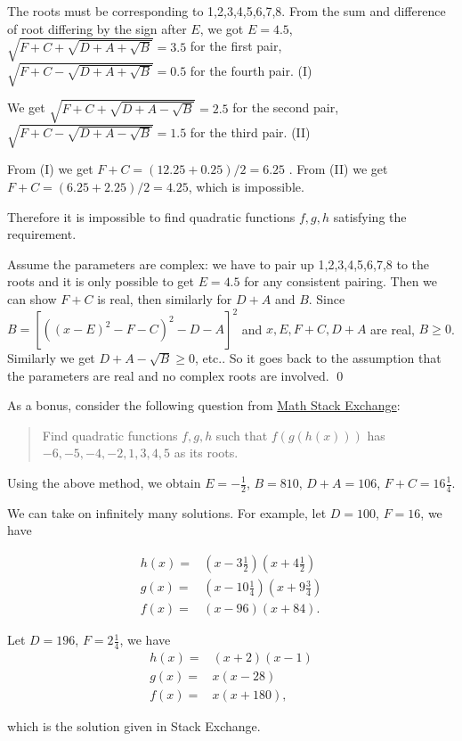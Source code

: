 The roots must be corresponding to 1,2,3,4,5,6,7,8. From the sum and difference of root differing by the sign after $E$, we got $E=4.5$, 
$ \sqrt{F+C + \sqrt{D+A + \sqrt{B}}} = 3.5 $ for the first pair, $ \sqrt{F+C - \sqrt{D+A + \sqrt{B}}} = 0.5 $ for the fourth pair. (I) 

We get $ \sqrt{F+C + \sqrt{D+A - \sqrt{B}}} = 2.5 $ for the second pair, $ \sqrt{F+C - \sqrt{D+A - \sqrt{B}}} = 1.5 $ for the third pair. (II)

From (I) we get $F+C = (12.25+0.25)/2=6.25$ . From (II) we get $F+C = (6.25+2.25)/2 = 4.25 $, which is impossible.

Therefore it is impossible to find quadratic functions $f,g,h$ satisfying the requirement. 

\hspace{3em}

Assume the parameters are complex: we have to pair up 1,2,3,4,5,6,7,8 to the roots and it is only possible to get $E=4.5$ for any consistent pairing. Then we can show $F+C$ is real, then similarly for $D+A$ and $B$.
Since $B = [((x-E)^2 - F - C)^2 - D - A]^2$ and $x, E, F+C, D+A$ are real, $B \ge 0$. Similarly we get $D+A - \sqrt{B} \ge 0$, etc.. So it goes back to the assumption that the parameters are real and no complex roots are involved.
\qed

\hspace{5em}

As a bonus, consider the following question from \href{https://math.stackexchange.com/questions/1724410/composition-of-three-quadratic-functions}{Math Stack Exchange}:

\begin{quote}
Find quadratic functions $f,g,h$ such that $f(g(h(x)))$ has $-6, -5, -4, -2, 1, 3, 4, 5$ as its roots.
\end{quote}

Using the above method, we obtain $E=-\frac{1}{2}$, $B=810$, $D+A=106$, $F+C=16\frac{1}{4}$.

We can take on infinitely many solutions. For example, let $D=100$, $F=16$, we have 

\begin{eqnarray*}
    h(x) =& (x-3\frac{1}{2})(x+4\frac{1}{2}) \\
    g(x) =& (x-10\frac{1}{4})(x+9\frac{3}{4}) \\
    f(x) =& (x-96)(x+84).
\end{eqnarray*}

Let $D=196$, $F=2\frac{1}{4}$, we have 
\begin{eqnarray*}
    h(x) =& (x+2)(x-1) \\
    g(x) =& x(x-28) \\
    f(x) =& x(x+180),
\end{eqnarray*}

which is the solution given in Stack Exchange.
